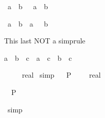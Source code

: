 \begin{isabellebody}
\begin{isamarkuptext}
\begin{isabelle}%
{\isacharminus}\ {\isacharparenleft}a\ {\isacharslash}\ b{\isacharparenright}\ {\isacharequal}\ {\isacharminus}\ a\ {\isacharslash}\ b%
\end{isabelle}

\begin{isabelle}%
{\isacharminus}\ {\isacharparenleft}a\ {\isacharslash}\ b{\isacharparenright}\ {\isacharequal}\ a\ {\isacharslash}\ {\isacharminus}\ b%
\end{isabelle}

This last NOT a simprule

\begin{isabelle}%
{\isacharparenleft}a\ {\isacharplus}\ b{\isacharparenright}\ {\isacharslash}\ c\ {\isacharequal}\ a\ {\isacharslash}\ c\ {\isacharplus}\ b\ {\isacharslash}\ c%
\end{isabelle}
%
\end{isamarkuptext}%
\isamarkuptrue%
\isamarkupfalse%
\ {\isachardoublequoteopen}{}{\isacharslash}{}\ {\isacharless}\ {\isacharparenleft}{}{\isacharslash}{}\ {\isacharcolon}{\isacharcolon}\ real{\isacharparenright}{\isachardoublequoteclose}\isanewline
%
\isadelimproof
%
\endisadelimproof
%
\isatagproof
{}\isamarkupfalse%
\ simp%
\endisatagproof
{\isafoldproof}%
%
\isadelimproof
\ \isanewline
%
\endisadelimproof
\isanewline
{}\isamarkupfalse%
\ {\isachardoublequoteopen}P\ {\isacharparenleft}{\isacharparenleft}{}{\isacharslash}{}{\isacharparenright}\ {\isacharasterisk}\ {\isacharparenleft}{}{\isacharslash}{}{}\ {\isacharcolon}{\isacharcolon}\ real{\isacharparenright}{\isacharparenright}{\isachardoublequoteclose}%
\isadelimproof
%
\endisadelimproof
%
\isatagproof
%
\begin{isamarkuptxt}%
\begin{isabelle}%
\ {}{\isachardot}\ P\ {\isacharparenleft}{}\ {\isacharslash}\ {}\ {\isacharasterisk}\ {\isacharparenleft}{}\ {\isacharslash}\ {}{}{\isacharparenright}{\isacharparenright}%
\end{isabelle}%
\end{isamarkuptxt}%
\isamarkuptrue%
\isamarkupfalse%
\ simp%
\begin{isamarkuptxt}%
\begin{isabelle}%

\end{isabelle}
\end{isamarkuptxt}
\end{isabellebody}
